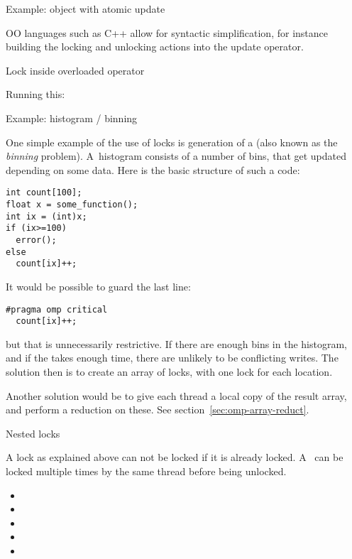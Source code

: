  {Example: object with atomic update}

\ac{OO} languages such as C++ allow for syntactic simplification,
for instance building the locking and unlocking actions into
the update operator.

\begin{cppnote}{Lock inside overloaded operator}
  \label{cpp:op-lock}

  Running this:

\end{cppnote}

 {Example: histogram / binning}

One simple example of the use of locks is generation of a 
(also known as the \emph{binning} problem).
A~histogram consists of a number of bins, that get updated depending on some data.
Here is the basic structure of such a code:
\begin{lstlisting}
int count[100];
float x = some_function();
int ix = (int)x;
if (ix>=100)
  error();
else
  count[ix]++;
\end{lstlisting}
It would be possible to guard the last line:
\begin{lstlisting}
#pragma omp critical
  count[ix]++;
\end{lstlisting}
but that is unnecessarily restrictive. If there are enough bins in the
histogram, and if the  takes enough time, there are unlikely to be
conflicting writes. The solution then is to create an array of locks, with
one lock for each  location.

Another solution would be to give each thread a local copy
of the result array, and perform a reduction on these.
See section~\ref{sec:omp-array-reduct}.

 {Nested locks}

A lock as explained above can not be locked if it is already locked.
A~ can be locked multiple times by the same
thread before being unlocked.

\begin{itemize}
\item {}
\item {}
\item {}
\item {}
\item {}
\end{itemize}

